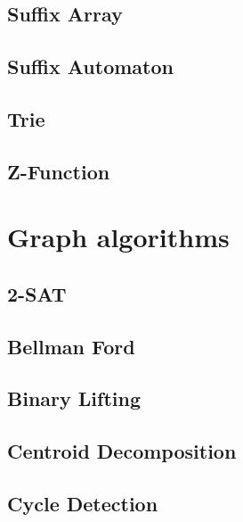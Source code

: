 \subsection{Suffix Array}
\raggedbottom
\hrulefill
\subsection{Suffix Automaton}
\raggedbottom
\hrulefill
\subsection{Trie}
\raggedbottom
\hrulefill
\subsection{Z-Function}
\raggedbottom
\hrulefill

\section{Graph algorithms}
\subsection{2-SAT}
\raggedbottom
\hrulefill
\subsection{Bellman Ford}
\raggedbottom
\hrulefill
\subsection{Binary Lifting}
\raggedbottom
\hrulefill
\subsection{Centroid Decomposition}
\raggedbottom
\hrulefill
\subsection{Cycle Detection}
\raggedbottom
\hrulefill

